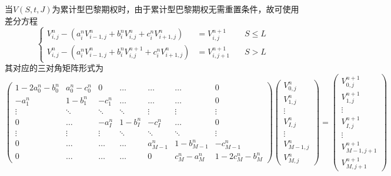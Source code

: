 \documentclass{ctexart} %
\begin{document}
当$V(S,t,J)$为累计型巴黎期权时，由于累计型巴黎期权无需重置条件，故可使用差分方程
\begin{equation}
\label{hcmu}
\left\{
\begin{aligned}
V^n_{i,j}-(a^n_iV^{n}_{i-1,j}+b^n_iV^{n}_{i,j}+c^n_iV^{n}_{i+1,j})&=V^{n+1}_{i,j} \quad &S\leq L \\
V^n_{i,j}-(a^n_iV^{n}_{i-1,j}+b^n_iV^{n+1}_{i,j}+c^n_iV^{n}_{i+1,j})&=V^{n+1}_{i,j+1} \quad &S > L 
\end{aligned}
\right.
\end{equation}
其对应的三对角矩阵形式为
\begin{equation}
\left(
\begin{matrix}
1-2a^n_0-b^n_0 & a^n_0-c^n_0 & 0       &\ldots  & \ldots &\ldots     & 0 \\
-a^n_1       & 1-b^n_1   & -c^n_1    &\ldots  & \ldots &\ldots     & 0       \\
\vdots     & \ddots  & \ddots  &\ddots  & \vdots & \vdots   & \vdots   \\
0          & \ldots  & -a^n_I    & 1-b^n_I  & -c^n_I    & \ldots  & 0    \\
\vdots     & \vdots  & \vdots  &\ddots  & \ddots & \ddots   & \vdots   \\
0          & \ldots  & \ldots  &\ldots  & a^n_{M-1} & 1-b^n_{M-1} & -c^n_{M-1}   \\
0          & \ldots  & \ldots  &\ldots  &0        & c^n_M-a^n_M & 1-2c^n_M-b^n_M      
\end{matrix}
\right)
\left(
\begin{matrix}
V_{0,j}^n\\
V_{1,j}^n\\
\vdots\\
V_{I,j}^n\\
\vdots\\
V_{M-1,j}^n\\
V_{M,j}^n
\end{matrix}
\right)
=
\left(
\begin{matrix}
V_{0,j}^{n+1}\\
V_{1,j}^{n+1}\\
\vdots\\
V_{I,j}^{n+1}\\
\vdots\\
V_{M-1,j+1}^{n+1}\\
V_{M,j+1}^{n+1}
\end{matrix}
\right)
\end{equation}
\end{document}
